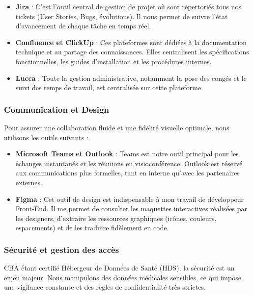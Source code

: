 \documentclass{article}
\begin{document}
\begin{itemize}
    \item \textbf{Jira} : C'est l'outil central de gestion de projet où sont répertoriés tous nos tickets (User Stories, Bugs, évolutions). Il nous permet de suivre l'état d'avancement de chaque tâche en temps réel.
    
    \item \textbf{Confluence et ClickUp} : Ces plateformes sont dédiées à la documentation technique et au partage des connaissances. Elles centralisent les spécifications fonctionnelles, les guides d'installation et les procédures internes.

    \item \textbf{Lucca} : Toute la gestion administrative, notamment la pose des congés et le suivi des temps de travail, est centralisée sur cette plateforme.
\end{itemize}

\subsubsection{Communication et Design}

Pour assurer une collaboration fluide et une fidélité visuelle optimale, nous utilisons les outils suivants :

\begin{itemize}
    \item \textbf{Microsoft Teams et Outlook} : Teams est notre outil principal pour les échanges instantanés et les réunions en visioconférence. Outlook est réservé aux communications plus formelles, tant en interne qu'avec les partenaires externes.
    
    \item \textbf{Figma} : Cet outil de design est indispensable à mon travail de développeur Front-End. Il me permet de consulter les maquettes interactives réalisées par les designers, d'extraire les ressources graphiques (icônes, couleurs, espacements) et de les traduire fidèlement en code.
\end{itemize}

\subsubsection{Sécurité et gestion des accès}

CBA étant certifié Hébergeur de Données de Santé (HDS), la sécurité est un enjeu majeur. Nous manipulons des données médicales sensibles, ce qui impose une vigilance constante et des règles de confidentialité très strictes.
\end{document}
